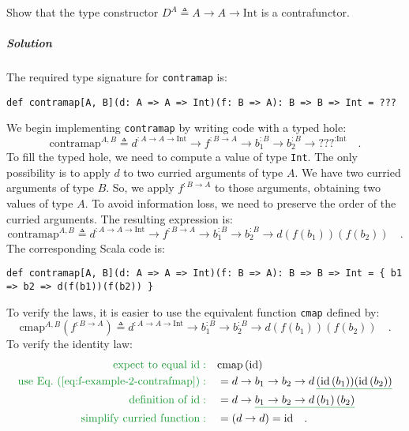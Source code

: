 Show that the type constructor $D^{A}\triangleq A\rightarrow A\rightarrow\text{Int}$
is a contrafunctor.

\subparagraph{Solution}

The required type signature for \lstinline!contramap! is:
\begin{lstlisting}
def contramap[A, B](d: A => A => Int)(f: B => A): B => B => Int = ???
\end{lstlisting}
We begin implementing \lstinline!contramap! by writing code with
a typed hole:
\[
\text{contramap}^{A,B}\triangleq d^{:A\rightarrow A\rightarrow\text{Int}}\rightarrow f^{:B\rightarrow A}\rightarrow b_{1}^{:B}\rightarrow b_{2}^{:B}\rightarrow\text{???}^{:\text{Int}}\quad.
\]
To fill the typed hole, we need to compute a value of type \lstinline!Int!.
The only possibility is to apply $d$ to two curried arguments of
type $A$. We have two curried arguments of type $B$. So, we apply
$f^{:B\rightarrow A}$ to those arguments, obtaining two values of
type $A$. To avoid information loss, we need to preserve the order
of the curried arguments. The resulting expression is:
\[
\text{contramap}^{A,B}\triangleq d^{:A\rightarrow A\rightarrow\text{Int}}\rightarrow f^{:B\rightarrow A}\rightarrow b_{1}^{:B}\rightarrow b_{2}^{:B}\rightarrow d\left(f(b_{1})\right)\left(f(b_{2})\right)\quad.
\]
The corresponding Scala code is: 
\begin{lstlisting}
def contramap[A, B](d: A => A => Int)(f: B => A): B => B => Int = { b1 => b2 => d(f(b1))(f(b2)) }
\end{lstlisting}
To verify the laws, it is easier to use the equivalent function \lstinline!cmap!
defined by:
\begin{equation}
\text{cmap}^{A,B}(f^{:B\rightarrow A})\triangleq d^{:A\rightarrow A\rightarrow\text{Int}}\rightarrow b_{1}^{:B}\rightarrow b_{2}^{:B}\rightarrow d\left(f(b_{1})\right)\left(f(b_{2})\right)\quad.\label{eq:f-example-2-contrafmap}
\end{equation}
To verify the identity law:
\begin{align*}
{\color{greenunder}\text{expect to equal }\text{id}:}\quad & \text{cmap}\left(\text{id}\right)\\
{\color{greenunder}\text{use Eq.~(\ref{eq:f-example-2-contrafmap})}:}\quad & =d\rightarrow b_{1}\rightarrow b_{2}\rightarrow d\,\gunderline{\left(\text{id}\,(b_{1})\right)}\gunderline{\left(\text{id}\,(b_{2})\right)}\\
{\color{greenunder}\text{definition of }\text{id}:}\quad & =d\rightarrow\gunderline{b_{1}\rightarrow b_{2}\rightarrow d\left(b_{1}\right)\left(b_{2}\right)}\\
{\color{greenunder}\text{simplify curried function}:}\quad & =\left(d\rightarrow d\right)=\text{id}\quad.
\end{align*}
